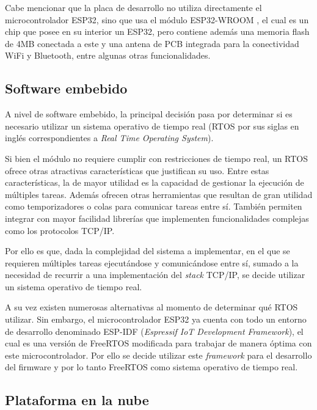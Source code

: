 
Cabe mencionar que la placa de desarrollo no utiliza directamente el microcontrolador ESP32, sino que usa el módulo ESP32-WROOM \citep{esp32_wroom}, el cual es un chip que posee en su interior un ESP32, pero contiene además una memoria flash de 4MB conectada a este y una antena de PCB integrada para la conectividad WiFi y Bluetooth, entre algunas otras funcionalidades.

\subsection{Software embebido}

A nivel de software embebido, la principal decisión pasa por determinar si es necesario utilizar un sistema operativo de tiempo real (RTOS por sus siglas en inglés correspondientes a \emph{Real Time Operating System}).

Si bien el módulo no requiere cumplir con restricciones de tiempo real, un RTOS ofrece otras atractivas características que justifican su uso. Entre estas características, la de mayor utilidad es la capacidad de gestionar la ejecución de múltiples tareas. Además ofrecen otras herramientas que resultan de gran utilidad como temporizadores o colas para comunicar tareas entre sí. También permiten integrar con mayor facilidad librerías que implementen funcionalidades complejas como los protocolos TCP/IP.

Por ello es que, dada la complejidad del sistema a implementar, en el que se requieren múltiples tareas ejecutándose y comunicándose entre sí, sumado a la necesidad de recurrir a una implementación del \emph{stack} TCP/IP, se decide utilizar un sistema operativo de tiempo real.

A su vez existen numerosas alternativas al momento de determinar qué RTOS utilizar. Sin embargo, el microcontrolador ESP32 ya cuenta con todo un entorno de desarrollo denominado ESP-IDF (\emph{Espressif IoT Development Framework}), el cual es una versión de FreeRTOS \citep{freertos} modificada para trabajar de manera óptima con este microcontrolador. Por ello se decide utilizar este \emph{framework} para el desarrollo del firmware y por lo tanto FreeRTOS como sistema operativo de tiempo real.

\subsection{Plataforma en la nube}
\label{plataforma_nube}

